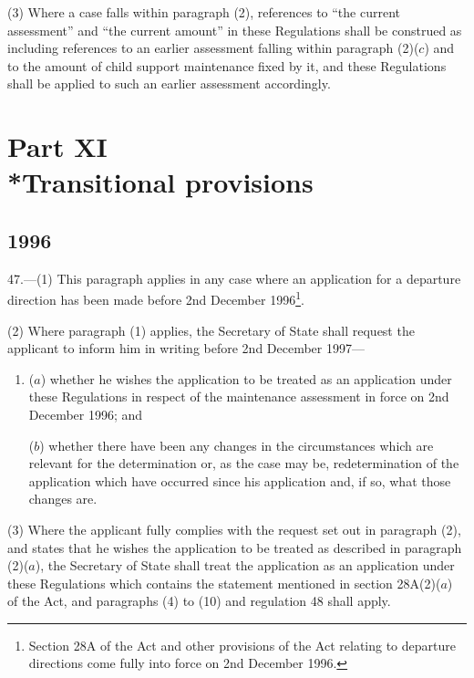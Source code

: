 \documentclass[a4paper]{article}
\newcommand{\parthead}{}
\begin{document}
(3) Where a case falls within paragraph (2), references to “the current
assessment” and “the current amount” in these Regulations shall be construed as
including references to an earlier assessment falling within paragraph (2)($c$)
and to the amount of child support maintenance fixed by it, and these
Regulations shall be applied to such an earlier assessment accordingly.

\section[Part XI --- Transitional provisions]{Part XI\\*Transitional provisions}

\renewcommand\parthead{--- Part XI}

\subsection[47. Transitional provisions—application before 2nd
December 1996]{\sloppy {} 1996}

47.—(1) This paragraph applies in any case where an application for
a departure direction has been made before 2nd December 1996\footnote{\frenchspacing Section 28A of the Act and other provisions of the Act relating to departure directions come fully into force on 2nd December 1996.}.

(2) Where paragraph (1) applies, the Secretary of State shall request the
applicant to inform him in writing before 2nd December 1997—
\begin{enumerate}\item[]
($a$) whether he wishes the application to be treated as an application under these
Regulations in respect of the maintenance assessment in force on 2nd December
1996; and

($b$) whether there have been any changes in the circumstances which are relevant
for the determination or, as the case may be, redetermination of the application
which have occurred since his application and, if so, what those changes are.
\end{enumerate}

(3) Where the applicant fully complies with the request set out in paragraph
(2), and states that he wishes the application to be treated as described in
paragraph (2)($a$), the Secretary of State shall treat the application as an
application under these Regulations which contains the statement mentioned in
section 28A(2)($a$) of the Act, and paragraphs (4) to (10) and regulation 48 shall
apply.
\end{document}
